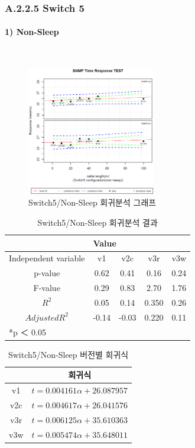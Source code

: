 \documentclass[11pt
  , a4paper
  , article
  , oneside
]{memoir}
\begin{document}
\subsubsection{A.2.2.5 Switch 5}
\paragraph{1) Non-Sleep}
   　
\begin{figure}[h!]
  \centering
  \includegraphics[width=0.5\textwidth]{./images/s5sx.eps}
  \caption{Switch5/Non-Sleep 회귀분석 그래프}
\end{figure}


\begin{table}[!htb]
\begin{center}
\begin{tabular}{c|c|c|c|c}\hline
& \multicolumn{4}{l}{Value} \\ \hline
Independent variable & v1 & v2c & v3r & v3w \\ \hline\hline
p-value& 0.62 & 0.41 & 0.16 & 0.24 \\ \hline
F-value& 0.29 & 0.83 & 2.70 & 1.76 \\ \hline
$  R^2  $ & 0.05 & 0.14 & 0.350 & 0.26 \\\hline
$ Adjusted R^2 $ & -0.14 & -0.03 & 0.220 & 0.11 \\\hline 
\multicolumn{5}{l}{*p ＜ 0.05} \\ \hline
\end{tabular}
\caption{Switch5/Non-Sleep 회귀분석 결과}
\end{center}
\end{table} 


\begin{table}[!htb]
\begin{center}
\begin{tabular}{c|c}\hline
 & 회귀식  \\ \hline\hline
v1 &  $ t=0.004161\alpha + 26.087957 $  \\ 
v2c & $ t=0.004617\alpha + 26.041576 $ \\ 
v3r & $ t=0.006125\alpha + 35.610363 $ \\ 
v3w & $ t=0.005474\alpha + 35.648011 $  \\ \hline
\end{tabular}
\caption{Switch5/Non-Sleep 버전별 회귀식}
\end{center}
\end{table} 
\end{document}
